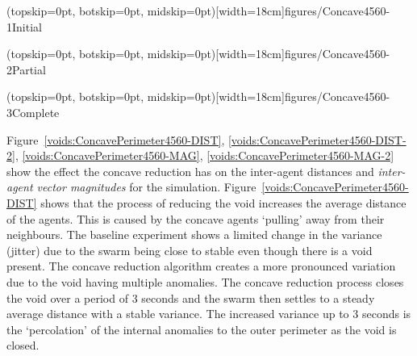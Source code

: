 \documentclass{ieeeaccess}
\begin{document}
\Figure[t!](topskip=0pt, botskip=0pt, midskip=0pt)[width=18cm]{figures/Concave4560-1}{Initial\label{fig:VoidConcaveReduction1}}

\Figure[t!](topskip=0pt, botskip=0pt, midskip=0pt)[width=18cm]{figures/Concave4560-2}{Partial\label{fig:VoidConcaveReduction2}}

\Figure[t!](topskip=0pt, botskip=0pt, midskip=0pt)[width=18cm]{figures/Concave4560-3}{Complete\label{fig:VoidConcaveReduction3}}

Figure~\ref{voids:ConcavePerimeter4560-DIST}, \ref{voids:ConcavePerimeter4560-DIST-2}, \ref{voids:ConcavePerimeter4560-MAG}, \ref{voids:ConcavePerimeter4560-MAG-2} show the effect the concave reduction has on the inter-agent distances and \textit{inter-agent vector magnitudes} for the simulation. 
Figure~\ref{voids:ConcavePerimeter4560-DIST} shows that the process of reducing the void increases the average distance of the agents. This is caused by the concave agents `pulling' away from their neighbours. The baseline experiment shows a limited change in the variance (jitter) due to the swarm being close to stable even though there is a void present. 
The concave reduction algorithm creates a more pronounced variation due to the void having multiple anomalies. The concave reduction process closes the void over a period of 3 seconds and the swarm then settles to a steady average distance with a stable variance. The increased variance up to 3 seconds is the `percolation' of the internal anomalies to the outer perimeter as the void is closed.
\end{document}
